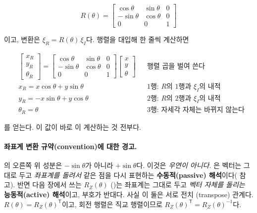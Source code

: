 \begin{equation}
\label{eq:lec01-R}
R(\theta) =
\begin{bmatrix}
\cos\theta & \sin\theta & 0 \\
-\sin\theta & \cos\theta & 0 \\
0 & 0 & 1
\end{bmatrix}
\end{equation}

이고, 변환은 $\xi_R = R(\theta)\,\xi_I$다. %
행렬을 대입해 한 줄씩 계산하면

\begin{align*}
&\begin{bmatrix} x_R \\ y_R \\ \theta_R \end{bmatrix}
 = \begin{bmatrix}
     \cos\theta & \sin\theta & 0 \\
     -\sin\theta & \cos\theta & 0 \\
     0 & 0 & 1
   \end{bmatrix}
   \begin{bmatrix} x \\ y \\ \theta \end{bmatrix}
 && \text{행렬 곱을 벌여 쓴다}\\
&x_R = x\cos\theta + y\sin\theta
 && \text{1행: $R$의 1행과 $\xi_I$의 내적}\\
&y_R = -x\sin\theta + y\cos\theta
 && \text{2행: $R$의 2행과 $\xi_I$의 내적}\\
&\theta_R = \theta
 && \text{3행: 자세각 자체는 바뀌지 않는다}
\end{align*}

를 얻는다. 이 값이 바로 이 계산하는 것 전부다.

\paragraph{좌표계 변환 규약(convention)에 대한 경고.}
의 오른쪽 위 성분은 $-\sin\theta$가 아니라 $+\sin\theta$다.
이것은 \emph{우연이 아니다}. 은 벡터는 그대로 두고
\emph{좌표계를 돌려서} 같은 점을 다시 표현하는 \textbf{수동적(passive)
해석}이다( 참고). 반면 다음 장에서 쓰는 $R_Z(\theta)$
()는 좌표계는 그대로 두고 \emph{벡터 자체를 돌리는}
\textbf{능동적(active) 해석}이고, 부호가 반대다. 사실 이 둘은 서로 전치
(transpose) 관계다. $R(\theta) = R_Z(\theta)^{\mathsf{T}}$이고, 회전
행렬은 직교 행렬이므로 $R_Z(\theta)^{\mathsf{T}} = R_Z(\theta)^{-1}$다.

